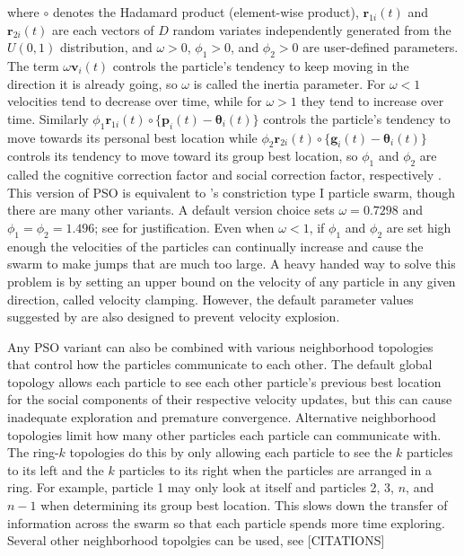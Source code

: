 \documentclass[12pt]{article}
\begin{document}
where $\circ$ denotes the Hadamard product (element-wise product), $\bm{r}_{1i}(t)$ and $\bm{r}_{2i}(t)$ are each vectors of $D$ random variates independently generated from the $U(0,1)$ distribution, and $\omega>0$, $\phi_1>0$, and $\phi_2>0$ are user-defined parameters. The term $\omega \bm{v}_i(t)$ controls the particle's tendency to keep moving in the direction it is already going, so $\omega$ is called the inertia parameter. For $\omega<1$ velocities tend to decrease over time, while for $\omega>1$ they tend to increase over time. Similarly $\phi_1 \bm{r}_{1i}(t)\circ\{\bm{p}_i(t) - \bm{\theta}_i(t)\}$ controls the particle's tendency to move towards its personal best location while $\phi_2 \bm{r}_{2i}(t)\circ\{\bm{g}_i(t) - \bm{\theta}_i(t)\}$ controls its tendency to move toward its group best location, so $\phi_1$ and $\phi_2$ are called the cognitive correction factor and social correction factor, respectively \citep{blum2008swarm}. This version of PSO is equivalent to \citet{clerc2002particle}'s constriction type I particle swarm, though there are many other variants. A default version choice sets $\omega = 0.7298$ and $\phi_1 = \phi_2 = 1.496$; see \citet{clerc2002particle} for justification. Even when $\omega<1$, if $\phi_1$ and $\phi_2$ are set high enough the velocities of the particles can continually increase and cause the swarm to make jumps that are much too large. A heavy handed way to solve this problem is by setting an upper bound on the velocity of any particle in any given direction, called velocity clamping. However, the default parameter values suggested by \citet{clerc2002particle} are also designed to prevent velocity explosion.

Any PSO variant can also be combined with various neighborhood topologies that control how the particles communicate to each other. The default global topology allows each particle to see each other particle's previous best location for the social components of their respective velocity updates, but this can cause inadequate exploration and premature convergence. Alternative neighborhood topologies limit how many other particles each particle can communicate with. The ring-$k$ topologies do this by only allowing each particle to see the $k$ particles to its left and the $k$ particles to its right when the particles are arranged in a ring. For example, particle 1 may only look at itself and particles 2, 3, $n$, and $n-1$ when determining its group best location. This slows down the transfer of information across the swarm so that each particle spends more time exploring. Several other neighborhood topolgies can be used, see [CITATIONS]
\end{document}

